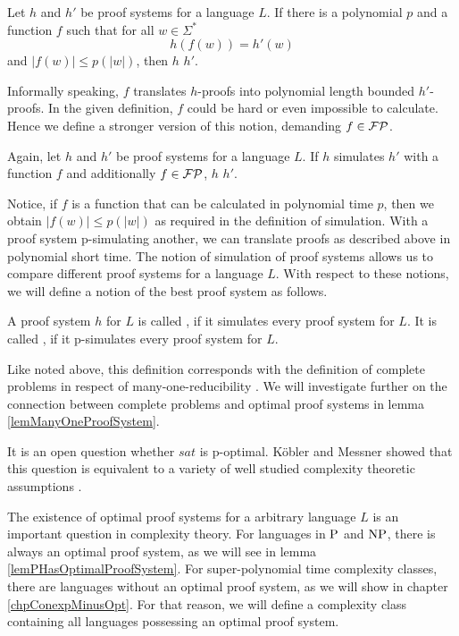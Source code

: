   \begin{definition}
    Let \(h\) and \(h'\) be proof systems for a language \(L\). If there is a polynomial \(p\) and a function \(f\) such that for all \(w \in \Sigma^*\)
      \[
        h(f(w)) = h'(w)
      \]
    and \(|f(w)| \leq p(|w|)\), then \(h\)  \(h'\).
  \end{definition}

  Informally speaking, \(f\) translates \(h\)-proofs into polynomial length bounded \(h'\)-proofs. In the given definition, \(f\) could be hard or even impossible to calculate. Hence we define a stronger version of this notion, demanding \(f \in \FP\).

  \begin{definition}
   Again, let \(h\) and \(h'\) be proof systems for a language \(L\). If \(h\) simulates \(h'\) with a function \(f\) and additionally \(f \in \FP\), \(h\)  \(h'\).
  \end{definition}

  Notice, if \(f\) is a function that can be calculated in polynomial time \(p\), then we obtain \(|f(w)| \leq p(|w|)\) as required in the definition of simulation. With a proof system p-simulating another, we can translate proofs as described above in polynomial short time. The notion of simulation of proof systems allows us to compare different proof systems for a language \(L\). With respect to these notions, we will define a notion of the best proof system as follows.

  \begin{definition}
    A proof system \(h\) for \(L\) is called , if it simulates every proof system for \(L\). It is called , if it p-simulates every proof system for \(L\).
  \end{definition}

  Like noted above, this definition corresponds with the definition of complete problems in respect of many-one-reducibility \cite{KMT03}. We will investigate further on the connection between complete problems and optimal proof systems in lemma \ref{lemManyOneProofSystem}.
   
  It is an open question whether \(sat\) is p-optimal. Köbler and Messner showed that this question is equivalent to a variety of well studied complexity theoretic assumptions \cite{KM00}.

  The existence of optimal proof systems for a arbitrary language \(L\) is an important question in complexity theory. For languages in \(\P\) and \(\NP\), there is always an optimal proof system, as we will see in lemma \ref{lemPHasOptimalProofSystem}. For super-polynomial time complexity classes, there are languages without an optimal proof system, as we will show in chapter \ref{chpConexpMinusOpt}. For that reason, we will define a complexity class containing all languages possessing an optimal proof system.


